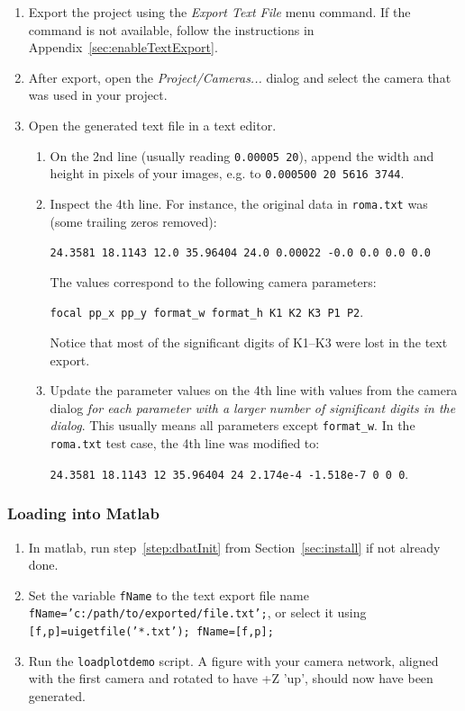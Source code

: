 \documentclass{article}
\begin{document}
\begin{enumerate}
\item Export the project using the \emph{Export Text File} menu
  command. If the command is not available, follow the instructions in
  Appendix~\ref{sec:enableTextExport}.
\item After export, open the \emph{Project/Cameras...} dialog and
  select the camera that was used in your project.
\item Open the generated text file in a text editor.
  \begin{enumerate}
  \item On the 2nd line (usually reading \texttt{0.00005 20}), append
    the width and height in pixels of your images, e.g. to
    \texttt{0.000500 20 5616 3744}.
  \item Inspect the 4th line. For instance,
    the original data in \texttt{roma.txt} was (some trailing zeros removed):

    \texttt{24.3581 18.1143 12.0 35.96404 24.0 0.00022 -0.0 0.0 0.0 0.0}

    The values correspond to the following camera parameters:

    \texttt{focal pp\_x pp\_y format\_w format\_h K1 K2 K3 P1 P2}.

    Notice that most of the significant digits of K1--K3 were lost in
    the text export.
  \item Update the parameter values on the 4th line with values from
    the camera dialog \emph{for each parameter with a larger number of
      significant digits in the dialog}. This usually means all
    parameters except \texttt{format\_w}. In the \texttt{roma.txt}
    test case, the 4th line was modified to:

    \texttt{24.3581 18.1143 12 35.96404 24 2.174e-4 -1.518e-7 0 0 0}.

  \end{enumerate}
\end{enumerate}

\subsubsection{Loading into Matlab}

\begin{enumerate}
\item In matlab, run step~\ref{step:dbatInit} from
  Section~\ref{sec:install} if not already done.
\item \sloppy Set the variable \texttt{fName} to the text export file name \texttt{fName='c:/path/to/exported/file.txt';}, or
  select it using \texttt{[f,p]=uigetfile('*.txt'); fName=[f,p];}
\item Run the \texttt{loadplotdemo} script. A figure with your camera
  network, aligned with the first camera and rotated to have +Z 'up',
  should now have been generated.
\end{enumerate}
\end{document}
